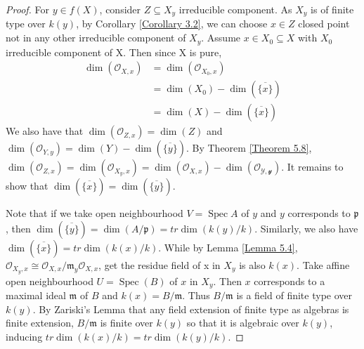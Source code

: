 \documentclass{ctexart}
\newcommand{\spec}{\operatorname{Spec}}
\begin{document}
\begin{proof}
    For $y\in f(X)$, consider $Z \subseteq X_{y}$ irreducible component.
    As $X_{y}$ is of finite type over $k(y)$, by Corollary \ref{Corollary 3.2}, we can choose $x\in Z$ closed point not in any other irreducible component of $X_{y}$.
    Assume $x\in X_{0} \subseteq X$ with $X_{0}$ irreducible component of X.
    Then since X is pure,
    \begin{equation*}
        \begin{split}
            \dim(\mathcal{O}_{X, x}) & = \dim(\mathcal{O}_{X_{0}, x}) \\
            & = \dim(X_{0}) - \dim(\overline{\{x\}}) \\
            & = \dim(X) - \dim(\overline{\{x\}})
        \end{split}
    \end{equation*}
    We also have that $\dim(\mathcal{O}_{Z, x}) = \dim(Z)$ and $\dim(\mathcal{O}_{Y, y}) = \dim(Y) - \dim(\overline{\{y\}})$.
    By Theorem \ref{Theorem 5.8}, $\dim(\mathcal{O}_{Z, x}) = \dim(\mathcal{O}_{X_{y}, x}) = \dim(\mathcal{O}_{X, x}) - \dim(\mathcal{O_{Y, y}})$.
    It remains to show that $\dim(\overline{\{x\}}) = \dim(\overline{\{y\}})$.
    \par
    Note that if we take open neighbourhood $V = \spec A$ of $y$ and $y$ corresponds to $\mathfrak{p}$, then $\dim(\overline{\{y\}}) = \dim(A/\mathfrak{p}) = tr\dim(k(y)/k)$.
    Similarly, we also have $\dim(\overline{\{x\}}) = tr\dim(k(x)/k)$.
    While by Lemma \ref{Lemma 5.4}, $\mathcal{O}_{X_{y}, x} \cong \mathcal{O}_{X, x}/\mathfrak{m}_{y}\mathcal{O}_{X, x}$, get the residue field of x in $X_{y}$ is also $k(x)$.
    Take affine open neighbourhood $U = \spec(B)$ of $x$ in $X_{y}$.
    Then $x$ corresponds to a maximal ideal $\mathfrak{m}$ of $B$ and $k(x) = B/\mathfrak{m}$.
    Thus $B/\mathfrak{m}$ is a field of finite type over $k(y)$.
    By Zariski's Lemma that any field extension of finite type as algebras is finite extension,
    $B/\mathfrak{m}$ is finite over $k(y)$ so that it is algebraic over $k(y)$, inducing $tr\dim(k(x)/k) = tr\dim(k(y)/k)$.
\end{proof}
\end{document}

